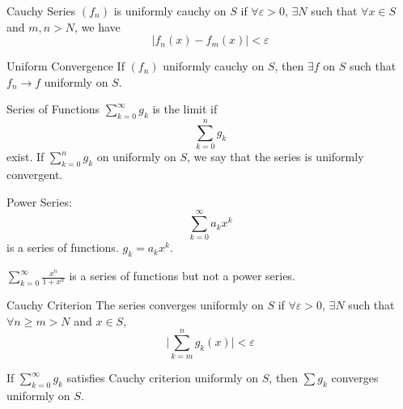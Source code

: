 \documentclass{report}
\begin{document}
\begin{definition}{Cauchy Series}
    $(f_{n})$ is uniformly cauchy on $S$ if $\forall \varepsilon> 0$, $\exists N$ such that $\forall x \in S$ and $m, n > N$, we have
        \begin{equation*}
            \lvert f_{n}(x) - f_{m}(x) \rvert < \varepsilon
        \end{equation*}
\end{definition}

\begin{theorem}{Uniform Convergence}
    If $(f_{n})$ uniformly cauchy on $S$, then $\exists f$ on $S$ such that $f_{n}\rightarrow f$ uniformly on $S$.
\end{theorem}

\begin{definition}{Series of Functions}
    $\sum_{k = 0}^{\infty} g_{k}$ is the limit if
        \begin{equation*}
            \sum_{k = 0}^{n}g_{k}
        \end{equation*}
    exist. If $\sum_{k = 0}^{n}g_{k}$ on uniformly on $S$, we say that the series is uniformly convergent.
\end{definition}

\begin{examples}
    \begin{example}
        Power Series: 
            \begin{equation*}
                \sum_{k = 0}^{\infty} a_{k}x^{k}
            \end{equation*}
        is a series of functions. $g_{k} = a_{k}x^{k}$.
    \end{example}
    \begin{example}
        $\sum_{k = 0}^{\infty}\frac{x^{n}}{1 + x^{n}}$ is a series of functions but not a power series.
    \end{example}
\end{examples}

\begin{definition}{Cauchy Criterion}
    The series converges uniformly on $S$ if $\forall \varepsilon > 0$, $\exists N$ such that $\forall n \geq m > N$ and $x \in S$, 
        \begin{equation*}
            \lvert \sum_{k = m}^{n}g_{k}(x) \rvert < \varepsilon
        \end{equation*}
\end{definition}

\begin{theorem}{25.6}
    If $\sum_{k = 0}^{\infty} g_{k}$ satisfies Cauchy criterion uniformly on $S$, then $\sum g_{k}$ converges uniformly on $S$.
\end{theorem}
\end{document}
